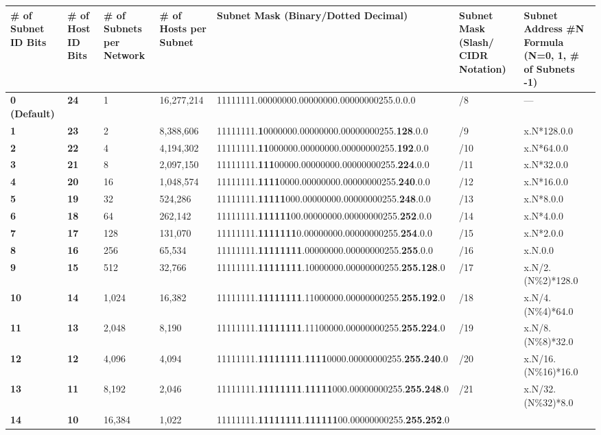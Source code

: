 \documentclass[b5paper,11pt]{memoir}
\begin{document}
\begin{longtable}[]{@{}lllllll@{}}
\toprule
\# of Subnet ID Bits & \# of Host ID Bits & \# of Subnets per Network &
\# of Hosts per Subnet & Subnet Mask (Binary/Dotted Decimal) & Subnet
Mask (Slash/ CIDR Notation) & Subnet Address \#N Formula (N=0, 1, \# of
Subnets -1)\tabularnewline
\midrule
\endhead
{\textbf{0 (Default)}} & {\textbf{24}} & 1 & 16,277,214 &
11111111.00000000.00000000.00000000255.0.0.0 & /8 & ---\tabularnewline
{\textbf{1}} & {\textbf{23}} & 2 & 8,388,606 &
11111111.{\textbf{1}}0000000.00000000.00000000255.{\textbf{128}}.0.0 &
/9 & x.N*128.0.0\tabularnewline
{\textbf{2}} & {\textbf{22}} & 4 & 4,194,302 &
11111111.{\textbf{11}}000000.00000000.00000000255.{\textbf{192}}.0.0 &
/10 & x.N*64.0.0\tabularnewline
{\textbf{3}} & {\textbf{21}} & 8 & 2,097,150 &
11111111.{\textbf{111}}00000.00000000.00000000255.{\textbf{224}}.0.0 &
/11 & x.N*32.0.0\tabularnewline
{\textbf{4}} & {\textbf{20}} & 16 & 1,048,574 &
11111111.{\textbf{1111}}0000.00000000.00000000255.{\textbf{240}}.0.0 &
/12 & x.N*16.0.0\tabularnewline
{\textbf{5}} & {\textbf{19}} & 32 & 524,286 &
11111111.{\textbf{11111}}000.00000000.00000000255.{\textbf{248}}.0.0 &
/13 & x.N*8.0.0\tabularnewline
{\textbf{6}} & {\textbf{18}} & 64 & 262,142 &
11111111.{\textbf{111111}}00.00000000.00000000255.{\textbf{252}}.0.0 &
/14 & x.N*4.0.0\tabularnewline
{\textbf{7}} & {\textbf{17}} & 128 & 131,070 &
11111111.{\textbf{1111111}}0.00000000.00000000255.{\textbf{254}}.0.0 &
/15 & x.N*2.0.0\tabularnewline
{\textbf{8}} & {\textbf{16}} & 256 & 65,534 &
11111111.{\textbf{11111111}}.00000000.00000000255.{\textbf{255}}.0.0 &
/16 & x.N.0.0\tabularnewline
{\textbf{9}} & {\textbf{15}} & 512 & 32,766 &
11111111.{\textbf{11111111}}.10000000.00000000255.{\textbf{255.128}}.0 &
/17 & x.N/2.(N\%2)*128.0\tabularnewline
{\textbf{10}} & {\textbf{14}} & 1,024 & 16,382 &
11111111.{\textbf{11111111}}.11000000.00000000255.{\textbf{255.192}}.0 &
/18 & x.N/4.(N\%4)*64.0\tabularnewline
{\textbf{11}} & {\textbf{13}} & 2,048 & 8,190 &
11111111.{\textbf{11111111}}.11100000.00000000255.{\textbf{255.224}}.0 &
/19 & x.N/8.(N\%8)*32.0\tabularnewline
{\textbf{12}} & {\textbf{12}} & 4,096 & 4,094 &
11111111.{\textbf{11111111}}.{\textbf{1111}}0000.00000000255.{\textbf{255.240}}.0
& /20 & x.N/16.(N\%16)*16.0\tabularnewline
{\textbf{13}} & {\textbf{11}} & 8,192 & 2,046 &
11111111.{\textbf{11111111}}.{\textbf{11111}}000.00000000255.{\textbf{255.248}}.0
& /21 & x.N/32.(N\%32)*8.0\tabularnewline
{\textbf{14}} & {\textbf{10}} & 16,384 & 1,022 &
11111111.{\textbf{11111111}}.{\textbf{111111}}00.00000000255.{\textbf{255.252}}.0

\end{longtable}
\end{document}
